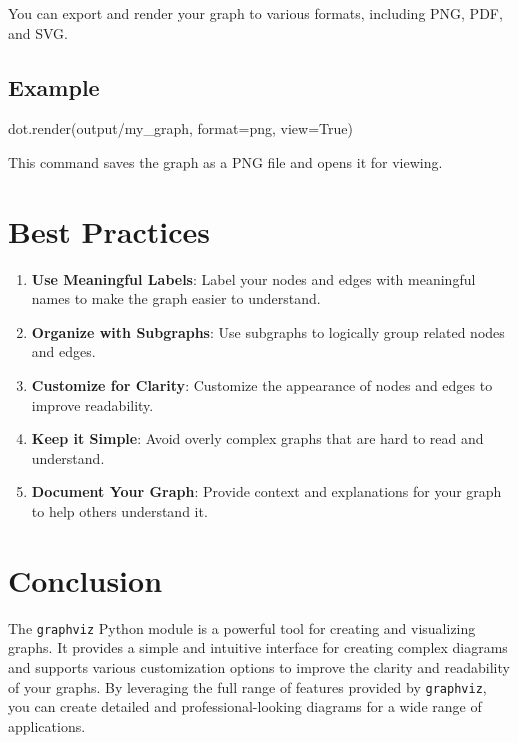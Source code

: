 \documentclass[
  letterpaper,
  DIV=11,
  numbers=noendperiod]{scrreprt}
\newenvironment{Shaded}{\begin{snugshade}}{\end{snugshade}}
\newcommand{\BuiltInTok}[1]{\textcolor[rgb]{0.00,0.23,0.31}{#1}}
\newcommand{\NormalTok}[1]{\textcolor[rgb]{0.00,0.23,0.31}{#1}}
\newcommand{\OperatorTok}[1]{\textcolor[rgb]{0.37,0.37,0.37}{#1}}
\newcommand{\StringTok}[1]{\textcolor[rgb]{0.13,0.47,0.30}{#1}}
\newcommand{\VariableTok}[1]{\textcolor[rgb]{0.07,0.07,0.07}{#1}}
\providecommand{\tightlist}{%
  \setlength{\itemsep}{0pt}\setlength{\parskip}{0pt}}\usepackage{longtable,booktabs,array}
\begin{document}
You can export and render your graph to various formats, including PNG,
PDF, and SVG.

\subsection{Example}\label{example-51}

\begin{Shaded}
\begin{Highlighting}[]
\NormalTok{dot.render(}\StringTok{\textquotesingle{}output/my\_graph\textquotesingle{}}\NormalTok{, }\BuiltInTok{format}\OperatorTok{=}\StringTok{\textquotesingle{}png\textquotesingle{}}\NormalTok{, view}\OperatorTok{=}\VariableTok{True}\NormalTok{)}
\end{Highlighting}
\end{Shaded}

This command saves the graph as a PNG file and opens it for viewing.

\section{Best Practices}\label{best-practices-7}

\begin{enumerate}
\def\labelenumi{\arabic{enumi}.}
\tightlist
\item
  \textbf{Use Meaningful Labels}: Label your nodes and edges with
  meaningful names to make the graph easier to understand.
\item
  \textbf{Organize with Subgraphs}: Use subgraphs to logically group
  related nodes and edges.
\item
  \textbf{Customize for Clarity}: Customize the appearance of nodes and
  edges to improve readability.
\item
  \textbf{Keep it Simple}: Avoid overly complex graphs that are hard to
  read and understand.
\item
  \textbf{Document Your Graph}: Provide context and explanations for
  your graph to help others understand it.
\end{enumerate}

\section{Conclusion}\label{conclusion-40}

The \texttt{graphviz} Python module is a powerful tool for creating and
visualizing graphs. It provides a simple and intuitive interface for
creating complex diagrams and supports various customization options to
improve the clarity and readability of your graphs. By leveraging the
full range of features provided by \texttt{graphviz}, you can create
detailed and professional-looking diagrams for a wide range of
applications.
\end{document}
